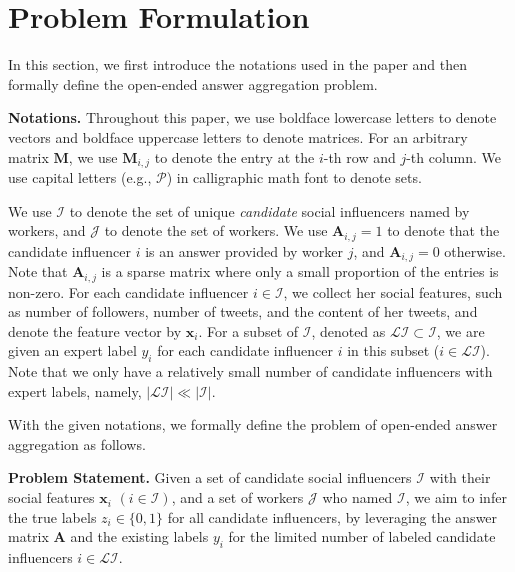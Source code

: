 \section{Problem Formulation}

In this section, we first introduce the notations used in the paper and then formally define the open-ended answer aggregation problem.

\smallskip
\noindent\textbf{Notations.} Throughout this paper, we use boldface lowercase letters to denote vectors and boldface uppercase letters to denote matrices. For an arbitrary matrix $\mathbf{M}$, we use $\mathbf{M}_{i,j}$ to denote the entry at the $i$-th row and $j$-th column. We use capital letters (e.g., $\mathcal{P}$) in calligraphic math font to denote sets.

We use $\mathcal{I}$ to denote the set of unique \emph{candidate} social influencers named by workers, and $\mathcal{J}$ to denote the set of workers. We use $\mathbf{A}_{i,j}=1$ to denote that the candidate influencer $i$ is an answer provided by worker $j$, and $\mathbf{A}_{i,j}=0$ otherwise. Note that $\mathbf{A}_{i,j}$ is a sparse matrix where only a small proportion of the entries is non-zero. 
For each candidate influencer $i \in \mathcal{I}$, we collect her social features, such as number of followers, number of tweets, and the content of her tweets, and denote the feature vector by $\mathbf{x}_i$. For a subset of $\mathcal{I}$, denoted as $\mathcal{LI}\subset \mathcal{I}$, we are given an expert label $y_i$ for each candidate influencer $i$ in this subset ($i\in \mathcal{LI}$). Note that we only have a relatively small number of candidate influencers with expert labels, namely, $|\mathcal{LI}| \ll |\mathcal{I}|$. %



With the given notations, we formally define the problem of open-ended answer aggregation as follows.

\smallskip
\noindent\textbf{Problem Statement.} Given a set of candidate social influencers $\mathcal{I}$ with their social features $\mathbf{x}_i$ $(i \in \mathcal{I})$, and a set of workers $\mathcal{J}$ who named $\mathcal{I}$, we aim to infer the true labels $z_i \in \{0,1\}$ for all candidate influencers, by leveraging the answer matrix $\mathbf{A}$ and the existing labels $y_i$ for the limited number of labeled candidate influencers $i\in \mathcal{LI}$. 